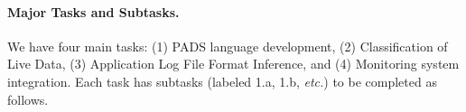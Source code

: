 % 
% 

\paragraph*{Major Tasks and Subtasks.}
We have four main tasks: (1) PADS language development, 
(2) Classification of Live Data, (3) Application Log File Format Inference,
and (4) Monitoring system integration.  Each task has subtasks
(labeled 1.a, 1.b, {\em etc.}) to be completed as follows.

